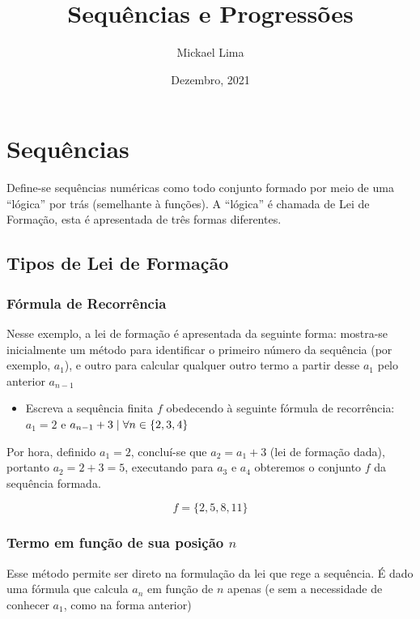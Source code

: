 \documentclass[12pt]{article}
\title{Sequências e Progressões}
\author{Mickael Lima}
\date{Dezembro, 2021}
\begin{document}
\maketitle
\pagebreak

\section{Sequências}

Define-se sequências numéricas como todo conjunto formado por meio de uma ``lógica'' por trás (semelhante à funções). A ``lógica'' é chamada de Lei de Formação, esta é apresentada de três formas diferentes.

\subsection{Tipos de Lei de Formação}

\subsubsection{Fórmula de Recorrência}

Nesse exemplo, a lei de formação é apresentada da seguinte forma: mostra-se inicialmente um método para identificar o primeiro número da sequência (por exemplo, $a_{1}$), e outro para calcular qualquer outro termo a partir desse $a_{1}$ pelo anterior $a_{n - 1}$

\begin{itemize}

  \item Escreva a sequência finita $f$ obedecendo à seguinte fórmula de recorrência: $a_{1} = 2$ e $a_{n - 1} + 3 \hspace{0.1cm} | \hspace{0.1cm} \forall n \in \{2, 3, 4\}$
\end{itemize}

Por hora, definido $a_{1} = 2$, concluí-se que $a_{2} = a_{1} + 3$ (lei de formação dada), portanto $a_{2} = 2 + 3 = 5$, executando para $a_{3}$ e $a_{4}$ obteremos o conjunto $f$ da sequência formada.

\[f = \{2, 5, 8, 11\}\]

\subsubsection{Termo em função de sua posição $n$}

Esse método permite ser direto na formulação da lei que rege a sequência. É dado uma fórmula que calcula $a_{n}$ em função de $n$ apenas (e sem a necessidade de conhecer $a_{1}$, como na forma anterior)
\end{document}

